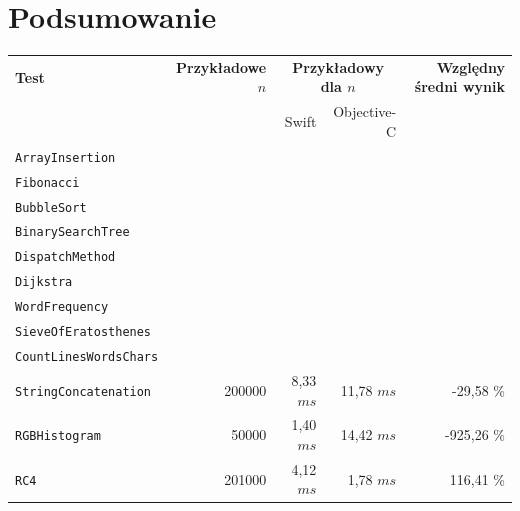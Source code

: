 \documentclass[mgr, shortabstract]{iithesis}
\begin{document}
\section{Podsumowanie}

\begin{center}
    \begin{tabular}{ lrrrr } 
     \hline
     \textbf{Test} & \textbf{Przykładowe $n$} & \multicolumn{2}{c}{\textbf{Przykładowy dla $n$}} & \textbf{Względny średni wynik} \\
     &  & Swift & Objective-C &  \\
     \hline
    \texttt{ArrayInsertion}  &  &  &  & \\ 
    \texttt{Fibonacci}  &  &  &  & \\ 
    \texttt{BubbleSort}  &  &  &  & \\ 
    \texttt{BinarySearchTree}  &  &  &  & \\ 
    \texttt{DispatchMethod}  &  &  &  & \\ 
    \texttt{Dijkstra} &  &  &  & \\ 
    \texttt{WordFrequency}  &  &  &  & \\ 
    \texttt{SieveOfEratosthenes}  &  &  &  & \\ 
    \texttt{CountLinesWordsChars}  &  &  &  & \\ 
    \texttt{StringConcatenation} & 200000 & 8,33 $ms$ & 11,78 $ms$ & -29,58 \% \\
    \texttt{RGBHistogram}  & 50000 & 1,40 $ms$ & 14,42 $ms$ & -925,26 \% \\ 
    \texttt{RC4} & 201000 & 4,12 $ms$ & 1,78 $ms$ & 116,41 \% \\ 
    \end{tabular}
\end{center}


\end{document}
